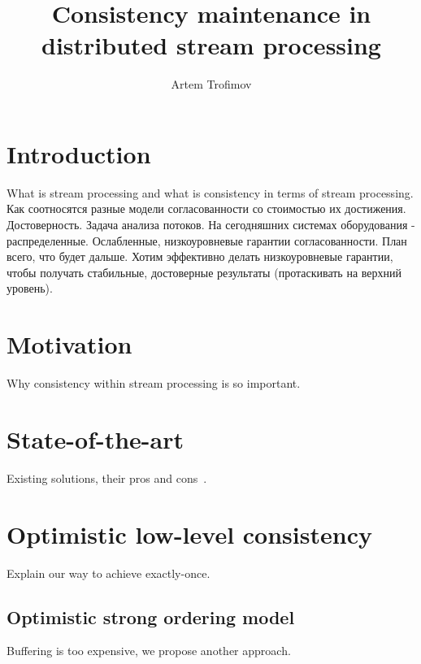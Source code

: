 \documentclass{llncs}
\begin{document}
\title {Consistency maintenance in distributed stream processing}
\author{Artem Trofimov}

\maketitle

\begin{abstract}

\end {abstract}

\section {Introduction}
What is stream processing and what is consistency in terms of stream processing.
Как соотносятся разные модели согласованности со стоимостью их достижения. Достоверность.
Задача анализа потоков. На сегодняшних системах оборудования - распределенные. Ослабленные, низкоуровневые гарантии согласованности. План всего, что будет дальше. Хотим эффективно делать низкоуровневые гарантии, чтобы получать стабильные, достоверные результаты (протаскивать на верхний уровень).

\section {Motivation}
Why consistency within stream processing is so important.

\section {State-of-the-art}
Existing solutions, their pros and cons~\cite{Carbone:2017:SMA:3137765.3137777, Zaharia:2012:DSE:2342763.2342773}. 

\section {Optimistic low-level consistency}
Explain our way to achieve exactly-once.

\subsection{Optimistic strong ordering model}
Buffering is too expensive, we propose another approach.
\end{document}
